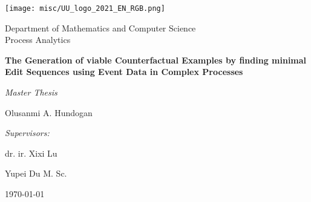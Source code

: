 \documentclass[./../paper.tex]{subfiles}
\begin{document}
\begin{titlepage}
    \centering
    \texttt{[image: misc/UU\_logo\_2021\_EN\_RGB.png]}\par
    Department of Mathematics and Computer Science\\
    Process Analytics

    \vspace{3cm}
    {\LARGE\textbf{The Generation of viable Counterfactual Examples by finding minimal Edit Sequences using Event Data in Complex Processes}}\par\vspace{0.5cm}
    {\large\textit{Master Thesis}}\par\vspace{1cm}
    {\large Olusanmi A. Hundogan}\par

    \vfill

    \emph{Supervisors:}\par
    dr. ir. Xixi Lu\par
    Yupei Du M. Sc.\par

    \today 
    \vspace{2cm}


\end{titlepage}
\end{document}
